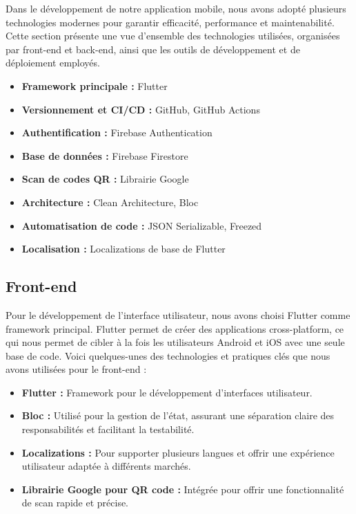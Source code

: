 Dans le développement de notre application mobile, nous avons adopté plusieurs technologies modernes pour garantir efficacité, performance et maintenabilité. Cette section présente une vue d'ensemble des technologies utilisées, organisées par front-end et back-end, ainsi que les outils de développement et de déploiement employés.

\begin{itemize}[noitemsep]
    \item \textbf{Framework principale :} Flutter
    \item \textbf{Versionnement et CI/CD :} GitHub, GitHub Actions
    \item \textbf{Authentification :} Firebase Authentication
    \item \textbf{Base de données :} Firebase Firestore
    \item \textbf{Scan de codes QR :} Librairie Google
    \item \textbf{Architecture :} Clean Architecture, Bloc
    \item \textbf{Automatisation de code :} JSON Serializable, Freezed
    \item \textbf{Localisation :} Localizations de base de Flutter
\end{itemize}

\subsection{Front-end}

Pour le développement de l'interface utilisateur, nous avons choisi Flutter comme framework principal. Flutter permet de créer des applications cross-platform, ce qui nous permet de cibler à la fois les utilisateurs Android et iOS avec une seule base de code. Voici quelques-unes des technologies et pratiques clés que nous avons utilisées pour le front-end :

\begin{itemize}[noitemsep]
    \item \textbf{Flutter :} Framework pour le développement d'interfaces utilisateur.
    \item \textbf{Bloc :} Utilisé pour la gestion de l'état, assurant une séparation claire des responsabilités et facilitant la testabilité.
    \item \textbf{Localizations :} Pour supporter plusieurs langues et offrir une expérience utilisateur adaptée à différents marchés.
    \item \textbf{Librairie Google pour QR code :} Intégrée pour offrir une fonctionnalité de scan rapide et précise.
\end{itemize}


